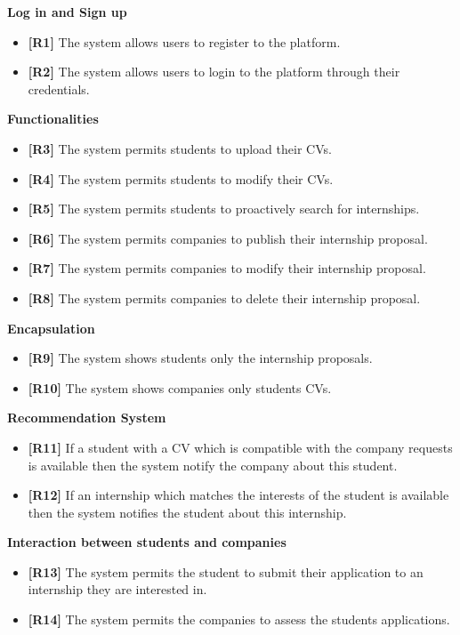 \documentclass[12pt]{article}
\begin{document}
    \textbf{Log in and Sign up}
        \begin{itemize}
            \item \textbf{[R1]} The system allows users to register to the platform.
            \item \textbf{[R2]} The system allows users to login to the platform through their credentials.
        \end{itemize}
    \textbf{Functionalities}
        \begin{itemize}
            \item \textbf{[R3]} The system permits students to upload their CVs.
            \item \textbf{[R4]} The system permits students to modify their CVs.
            \item \textbf{[R5]} The system permits students to proactively search for internships.
            \item \textbf{[R6]} The system permits companies to publish their internship proposal.
            \item \textbf{[R7]} The system permits companies to modify their internship proposal.
            \item \textbf{[R8]} The system permits companies to delete their internship proposal.
        \end{itemize}
    \textbf{Encapsulation}
        \begin{itemize}
            \item \textbf{[R9]} The system shows students only the internship proposals.
            \item \textbf{[R10]} The system shows companies only students CVs.
        \end{itemize}
    \textbf{Recommendation System}
        \begin{itemize}
            \item \textbf{[R11]} If a student with a CV which is compatible with the company requests is available then the system notify the company about this student.
            \item \textbf{[R12]} If an internship which matches the interests of the student is available then the system notifies the student about this internship.
        \end{itemize}
    \textbf{Interaction between students and companies}
        \begin{itemize}
            \item \textbf{[R13]} The system permits the student to submit their application to an internship they are interested in.
            \item \textbf{[R14]} The system permits the companies to assess the students applications.
        \end{itemize}
\end{document}

